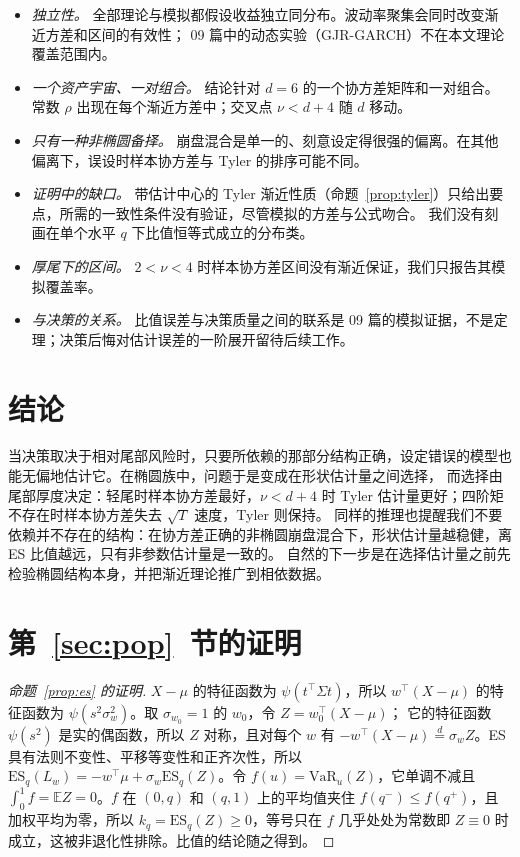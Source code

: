 \documentclass[11pt,UTF8]{ctexart}
\newcommand{\E}{\mathbb{E}}
\newcommand{\ES}{\mathrm{ES}}
\begin{document}
\begin{itemize}
\item \emph{独立性。} 全部理论与模拟都假设收益独立同分布。波动率聚集会同时改变渐近方差和区间的有效性；
09 篇中的动态实验（GJR-GARCH）不在本文理论覆盖范围内。
\item \emph{一个资产宇宙、一对组合。} 结论针对 $d=6$ 的一个协方差矩阵和一对组合。常数 $\rho$ 出现在每个渐近方差中；交叉点 $\nu<d+4$ 随 $d$ 移动。
\item \emph{只有一种非椭圆备择。} 崩盘混合是单一的、刻意设定得很强的偏离。在其他偏离下，误设时样本协方差与 Tyler 的排序可能不同。
\item \emph{证明中的缺口。} 带估计中心的 Tyler 渐近性质（命题~\ref{prop:tyler}）只给出要点，所需的一致性条件没有验证，尽管模拟的方差与公式吻合。
我们没有刻画在单个水平 $q$ 下比值恒等式成立的分布类。
\item \emph{厚尾下的区间。} $2<\nu<4$ 时样本协方差区间没有渐近保证，我们只报告其模拟覆盖率。
\item \emph{与决策的关系。} 比值误差与决策质量之间的联系是 09 篇的模拟证据，不是定理；决策后悔对估计误差的一阶展开留待后续工作。
\end{itemize}

\section{结论}

当决策取决于相对尾部风险时，只要所依赖的那部分结构正确，设定错误的模型也能无偏地估计它。在椭圆族中，问题于是变成在形状估计量之间选择，
而选择由尾部厚度决定：轻尾时样本协方差最好，$\nu<d+4$ 时 Tyler 估计量更好；四阶矩不存在时样本协方差失去 $\sqrt T$ 速度，Tyler 则保持。
同样的推理也提醒我们不要依赖并不存在的结构：在协方差正确的非椭圆崩盘混合下，形状估计量越稳健，离 ES 比值越远，只有非参数估计量是一致的。
自然的下一步是在选择估计量之前先检验椭圆结构本身，并把渐近理论推广到相依数据。

\appendix
\section{第~\ref{sec:pop}~节的证明}\label{app:pop}

\begin{proof}[命题~\ref{prop:es} 的证明]
$X-\mu$ 的特征函数为 $\psi(t^\top\Sigma t)$，所以 $w^\top(X-\mu)$ 的特征函数为 $\psi(s^2\sigma_w^2)$。取 $\sigma_{w_0}=1$ 的 $w_0$，令 $Z=w_0^\top(X-\mu)$；
它的特征函数 $\psi(s^2)$ 是实的偶函数，所以 $Z$ 对称，且对每个 $w$ 有 $-w^\top(X-\mu)\overset d=\sigma_wZ$。ES 具有法则不变性、平移等变性和正齐次性，所以
$\ES_q(L_w)=-w^\top\mu+\sigma_w\ES_q(Z)$。令 $f(u)=\mathrm{VaR}_u(Z)$，它单调不减且 $\int_0^1f=\E Z=0$。$f$ 在 $(0,q)$ 和 $(q,1)$ 上的平均值夹住
$f(q^-)\le f(q^+)$，且加权平均为零，所以 $k_q=\ES_q(Z)\ge0$，等号只在 $f$ 几乎处处为常数即 $Z\equiv0$ 时成立，这被非退化性排除。比值的结论随之得到。
\end{proof}
\end{document}
